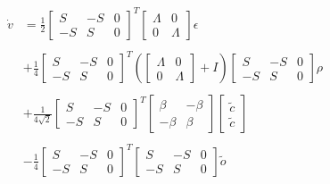 \begin{enumerate}
\begin{align*}
\dot{v} &= 
\frac{1}{2}
\begin{bmatrix}
S & - S & 0
\\
-S & S & 0
\end{bmatrix}^T
\begin{bmatrix}
\Lambda & 0
\\
0 & \Lambda
\end{bmatrix}
\epsilon
\\
\\
&+ 
\frac{1}{4}
\begin{bmatrix}
S & - S & 0
\\
-S & S & 0
\end{bmatrix}^T
\left(
\begin{bmatrix}
\Lambda & 0
\\
0 & \Lambda
\end{bmatrix}
+ I
\right)
\begin{bmatrix}
S & -S & 0
\\
-S & S & 0
\end{bmatrix} \rho
\\
\\
&+
\frac{1}{4\sqrt{2}}
\begin{bmatrix}
S & - S & 0
\\
-S & S & 0
\end{bmatrix}^T
\begin{bmatrix}
\beta & -\beta
\\
-\beta & \beta
\end{bmatrix}
\begin{bmatrix}
\tilde{c}
\\
\tilde{c}
\end{bmatrix}
\\
\\
&-
\frac{1}{4}
\begin{bmatrix}
S & - S & 0
\\
-S & S & 0
\end{bmatrix}^T
\begin{bmatrix}
S & -S & 0
\\
-S & S & 0
\end{bmatrix} \tilde{o}
\\
\\
\end{align*}


\end{enumerate}
